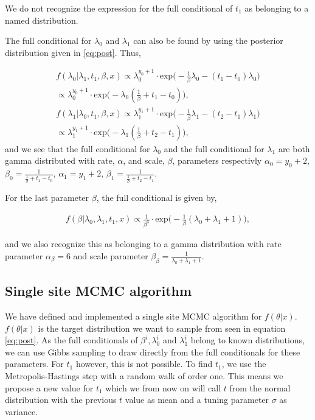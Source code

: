 We do not recognize the expression for the full conditional of $t_1$ as belonging to a named distribution. 

The full conditional for $\lambda_0$ and $\lambda_1$ can also be found by using the posterior distribution given in \eqref{eq:post}. Thus, 

\begin{align}
    f(\lambda_0 | \lambda_1, t_1, \beta, x) \propto
    \lambda_0^{y_0 + 1}\cdot \text{exp} \Big( -\frac{1}{\beta} \lambda_0 - (t_1 - t_0)\lambda_0 \Big) 
    \nonumber \\
    \propto  \lambda_0^{y_0 + 1} \cdot \text{exp} \Big( - \lambda_0 (\frac{1}{\beta} + t_1 - t_0) \Big),
     \\
    f(\lambda_1 | \lambda_0, t_1, \beta, x) \propto
    \lambda_1^{y_1 + 1}\cdot \text{exp} \Big( -\frac{1}{\beta} \lambda_1 - (t_2 - t_1)\lambda_1 \Big) \nonumber \\
    \propto  \lambda_1^{y_1 + 1} \cdot \text{exp} \Big( - \lambda_1 (\frac{1}{\beta} + t_2 - t_1) \Big),
\end{align}
and we see that the full conditional for $\lambda_0$ and the full conditional for $\lambda_1$ are both gamma distributed with rate, $\alpha$, and scale, $\beta$, parameters respectivly $\alpha_0 = y_0 + 2$, $\beta_0 = \frac{1}{\frac{1}{\beta} + t_1 - t_0}$, $\alpha_1 = y_1 + 2$, $\beta_1 = \frac{1}{\frac{1}{\beta} + t_2 - t_1}$. 



For the last parameter $\beta$, the full conditional is given by,

\begin{align}
    f(\beta | \lambda_0, \lambda_1, t_1, x) \propto 
    \frac{1}{\beta^5} \cdot \text{exp} \Big( -\frac{1}{\beta}(\lambda_0 + \lambda_1 + 1) \Big),
\end{align}

and we also recognize this as belonging to a gamma distribution with rate parameter $\alpha_{\beta} = 6$ and scale parameter $\beta_{\beta} = \frac{1}{\lambda_0 + \lambda_1 + 1} $. 

\subsection{Single site MCMC algorithm}

We have defined and implemented a single site MCMC algorithm for $f(\theta |x)$. $f(\theta|x)$ is the target distribution we want to sample from seen in equation \ref{eq:post}.  As the full conditionals of $\beta^i, \lambda_0^i$ and $\lambda_1^i$ belong to known distributions, we can use Gibbs sampling to draw directly from the full conditionals for these parameters. For $t_1$ however, this is not possible.
To find $t_1$, we use the Metropolis-Hastings step with a random walk of order one. This means we propose a new value for $t_1$ which we from now on will call $t$ from the normal distribution with the previous $t$ value as mean and a tuning parameter $\sigma$ as variance. 

